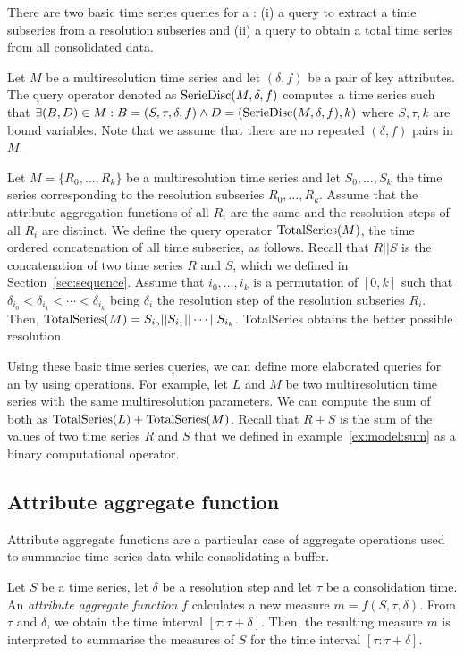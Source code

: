 There are two basic time series queries for a : (i) a
query to extract a time subseries from a resolution subseries and (ii)
a query to obtain a total time series from all consolidated data.

Let $M$ be a multiresolution time series and let $(\delta,f)$ be a
pair of key attributes.  The query operator denoted as
$\operatorname{SerieDisc}(M,\delta,f)$ computes a time series such that $\exists
(B,D) \in M: B=(S,\tau,\delta,f) \wedge D=(\operatorname{SerieDisc}(M,\delta,f), k)
$ where $S,\tau,k$ are bound variables.  Note that we assume that
there are no repeated $(\delta,f)$ pairs in $M$.

Let $M=\{R_0,\dots,R_k\}$ be a multiresolution time series and let
$S_0, \dots, S_k$ the time series corresponding to the resolution
subseries $R_0,\dots,R_k$. Assume that the attribute aggregation
functions of all $R_i$ are the same and the resolution steps of all
$R_i$ are distinct. We define the query operator $\operatorname{TotalSeries}(M)$,
the time ordered concatenation of all time subseries, as
follows. Recall that $R||S$ is the concatenation of two time series
$R$ and $S$, which we defined in Section~\ref{sec:sequence}. Assume
that $i_0,\dots,i_k$ is a permutation of $[0,k]$ such that
$\delta_{i_0} < \delta_{i_1} < \cdots < \delta_{i_k}$ being $\delta_i$
the resolution step of the resolution subseries $R_i$. Then,
$\operatorname{TotalSeries}(M) = S_{i_0} || S_{i_1} || \cdots ||
S_{i_k}$. TotalSeries obtains the better possible resolution.

Using these basic time series queries, we can define more elaborated
queries for an  by using  operations. For
example, let $L$ and $M$ be two multiresolution time series with the
same multiresolution parameters. We can compute the sum of both as
$\operatorname{TotalSeries}(L) + \operatorname{TotalSeries}(M)$. Recall that $R+S$ is the sum of
the values of two time series $R$ and $S$ that we defined in
example~\ref{ex:model:sum} as a binary computational operator.


\subsection{Attribute aggregate function}
\label{sec:model:interpolador}

Attribute aggregate functions are a particular case of 
aggregate operations used to summarise time series data while
consolidating a buffer.

Let $S$ be a time series, let $\delta$ be a resolution step and let
$\tau$ be a consolidation time.  An \emph{attribute aggregate
  function} $f$ calculates a new measure $m=f(S,\tau,\delta)$. From
$\tau$ and $\delta$, we obtain the time interval $[\tau:\tau+\delta]$.
Then, the resulting measure $m$ is interpreted to summarise the
measures of $S$ for the time interval $[\tau:\tau+\delta]$.

